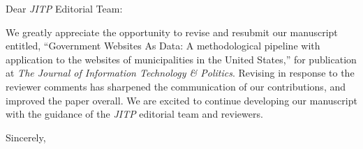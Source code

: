 \documentclass[a4paper]{letter}
\begin{document}
 
\begin{letter} 


 

 
\opening{Dear {\em JITP} Editorial Team:}
\medskip 

We greatly appreciate the opportunity to revise and resubmit our manuscript entitled, ``Government Websites As Data:  A methodological pipeline with application to the websites of municipalities in the United States,'' for publication at {\em The Journal of Information Technology \& Politics}.  Revising in response to the reviewer comments has sharpened the communication of our contributions, and improved the paper overall.  We are excited to continue developing our manuscript with the guidance of the {\em JITP} editorial team and reviewers.

\closing{Sincerely,} 

\end{letter} 
\end{document}
